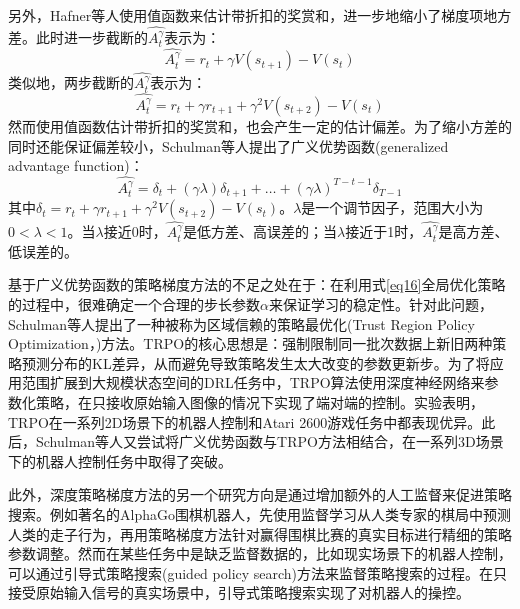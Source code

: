 \documentclass[bachelor]{thesis-uestc}
\begin{document}
	另外，Hafner等人\cite{hafner2011reinforcement}使用值函数来估计带折扣的奖赏和，进一步地缩小了梯度项地方差。此时进一步截断的$\hat{A_t^\gamma}$表示为：
	\begin{equation}
		\label{eq20}
		\hat{A_t^\gamma}=r_t+\gamma V(s_{t+1})-V(s_t)
	\end{equation}
	类似地，两步截断的$\hat{A_t^\gamma}$表示为：
	\begin{equation}
		\label{eq21}
		\hat{A_t^\gamma}=r_t+\gamma r_{t+1}+\gamma^2V(s_{t+2})-V(s_t)
	\end{equation}
	然而使用值函数估计带折扣的奖赏和，也会产生一定的估计偏差。为了缩小方差的同时还能保证偏差较小，Schulman等人提出了广义优势函数(generalized advantage function)：
	\begin{equation}
		\label{eq22}
		\hat{A_t^\gamma}=\delta_t+(\gamma\lambda)\delta_{t+1}+\dots+(\gamma\lambda)^{T-t-1}\delta_{T-1}
	\end{equation}
	其中$\delta_t=r_t+\gamma r_{t+1}+\gamma^2V(s_{t+2})-V(s_t)$。$\lambda$是一个调节因子，范围大小为$0<\lambda<1$。当$\lambda$接近0时，$\hat{A_t^\gamma}$是低方差、高误差的；当$\lambda$接近于1时，$\hat{A_t^\gamma}$是高方差、低误差的。
	
	基于广义优势函数的策略梯度方法的不足之处在于：在利用式\ref{eq16}全局优化策略的过程中，很难确定一个合理的步长参数$\alpha$来保证学习的稳定性。针对此问题，Schulman\cite{Schulman2015Trust}等人提出了一种被称为区域信赖的策略最优化(Trust Region Policy Optimization，)方法。TRPO的核心思想是：强制限制同一批次数据上新旧两种策略预测分布的KL差异，从而避免导致策略发生太大改变的参数更新步。为了将应用范围扩展到大规模状态空间的DRL任务中，TRPO算法使用深度神经网络来参数化策略，在只接收原始输入图像的情况下实现了端对端的控制。实验表明，TRPO在一系列2D场景下的机器人控制和Atari 2600游戏任务中都表现优异。此后，Schulman等人\cite{schulman2015high}又尝试将广义优势函数与TRPO方法相结合，在一系列3D场景下的机器人控制任务中取得了突破。
	
	此外，深度策略梯度方法的另一个研究方向是通过增加额外的人工监督来促进策略搜索。例如著名的AlphaGo围棋机器人，先使用监督学习从人类专家的棋局中预测人类的走子行为，再用策略梯度方法针对赢得围棋比赛的真实目标进行精细的策略参数调整。然而在某些任务中是缺乏监督数据的，比如现实场景下的机器人控制，可以通过引导式策略搜索(guided policy search)方法来监督策略搜索的过程。在只接受原始输入信号的真实场景中，引导式策略搜索实现了对机器人的操控。
	
\end{document}
